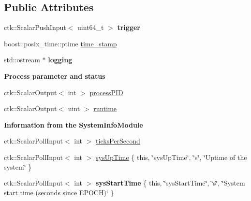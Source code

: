 \subsection*{Public Attributes}
\begin{DoxyCompactItemize}
\item 
ctk\+::\+Scalar\+Push\+Input$<$ uint64\+\_\+t $>$ {\bfseries trigger}
\item 
boost\+::posix\+\_\+time\+::ptime \hyperlink{structProcessInfoModule_af863af6e454aa703037963ad401cae92}{time\+\_\+stamp}
\item 
std\+::ostream $\ast$ {\bfseries logging}\hypertarget{structProcessInfoModule_a868c52f7b5aa78cd208215b381fc12eb}{}\label{structProcessInfoModule_a868c52f7b5aa78cd208215b381fc12eb}

\end{DoxyCompactItemize}
\begin{Indent}{\bf Process parameter and status}\par
\begin{DoxyCompactItemize}
\item 
ctk\+::\+Scalar\+Output$<$ int $>$ \hyperlink{structProcessInfoModule_aae5355d8100a201888fd835a7515f456}{process\+P\+ID}
\item 
ctk\+::\+Scalar\+Output$<$ uint $>$ \hyperlink{structProcessInfoModule_a8c11129c477f0177e253f3ce414d0fc3}{runtime}
\end{DoxyCompactItemize}
\end{Indent}
\begin{Indent}{\bf Information from the System\+Info\+Module}\par
\begin{DoxyCompactItemize}
\item 
ctk\+::\+Scalar\+Poll\+Input$<$ int $>$ \hyperlink{structProcessInfoModule_adf12150c732bc07aed50684eb8a90fd7}{ticks\+Per\+Second}
\item 
ctk\+::\+Scalar\+Poll\+Input$<$ int $>$ \hyperlink{structProcessInfoModule_af7b86dd5c8d50168f7d64ed21ddd48e7}{sys\+Up\+Time} \{ this, \char`\"{}sys\+Up\+Time\char`\"{}, \char`\"{}s\char`\"{}, \char`\"{}Uptime of the system\char`\"{} \}
\item 
ctk\+::\+Scalar\+Poll\+Input$<$ int $>$ {\bfseries sys\+Start\+Time} \{ this, \char`\"{}sys\+Start\+Time\char`\"{}, \char`\"{}s\char`\"{}, \char`\"{}System start time (seconds since E\+P\+O\+CH)\char`\"{} \}\hypertarget{structProcessInfoModule_a2202806036feab927de3bed80524fd3d}{}\label{structProcessInfoModule_a2202806036feab927de3bed80524fd3d}

\end{DoxyCompactItemize}
\end{Indent}
